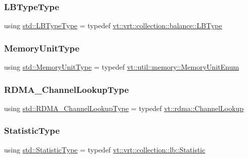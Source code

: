 \mbox{\label{namespacestd_ae3c14c256fabd8bbed83c439b367c3d8}} 
\subsubsection{\texorpdfstring{L\+B\+Type\+Type}{LBTypeType}}
{\footnotesize\ttfamily using \hyperlink{namespacevt_1_1vrt_1_1collection_1_1balance_ac4f99693509affcc67db182d4aad9b5c}{std\+::\+L\+B\+Type\+Type} = typedef \hyperlink{namespacevt_1_1vrt_1_1collection_1_1balance_ac4f99693509affcc67db182d4aad9b5c}{vt\+::vrt\+::collection\+::balance\+::\+L\+B\+Type}}

\mbox{\label{namespacestd_ad7105ed4fa94bea7fce7b09cea2c7165}} 
\subsubsection{\texorpdfstring{Memory\+Unit\+Type}{MemoryUnitType}}
{\footnotesize\ttfamily using \hyperlink{namespacevt_1_1util_1_1memory_a64df3d84293b34009f78e2a1db2f9bb6}{std\+::\+Memory\+Unit\+Type} = typedef \hyperlink{namespacevt_1_1util_1_1memory_a64df3d84293b34009f78e2a1db2f9bb6}{vt\+::util\+::memory\+::\+Memory\+Unit\+Enum}}

\mbox{\label{namespacestd_a30c426bd959ae4c3814e36d01efe9df7}} 
\subsubsection{\texorpdfstring{R\+D\+M\+A\+\_\+\+Channel\+Lookup\+Type}{RDMA\_ChannelLookupType}}
{\footnotesize\ttfamily using \hyperlink{namespacestd_a30c426bd959ae4c3814e36d01efe9df7}{std\+::\+R\+D\+M\+A\+\_\+\+Channel\+Lookup\+Type} = typedef \hyperlink{structvt_1_1rdma_1_1_channel_lookup}{vt\+::rdma\+::\+Channel\+Lookup}}

\mbox{\label{namespacestd_a77b0310083adc8639f9659f5c8b3cf0d}} 
\subsubsection{\texorpdfstring{Statistic\+Type}{StatisticType}}
{\footnotesize\ttfamily using \hyperlink{namespacevt_1_1vrt_1_1collection_1_1lb_af0e20ef9afee77295053aa83bf1348b1}{std\+::\+Statistic\+Type} = typedef \hyperlink{namespacevt_1_1vrt_1_1collection_1_1lb_af0e20ef9afee77295053aa83bf1348b1}{vt\+::vrt\+::collection\+::lb\+::\+Statistic}}

